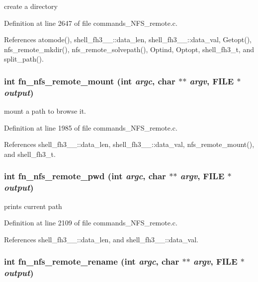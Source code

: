 create a directory 

Definition at line 2647 of file commands\_\-NFS\_\-remote.c.

References atomode(), shell\_\-fh3\_\-\_\-::data\_\-len, shell\_\-fh3\_\-\_\-::data\_\-val, Getopt(), nfs\_\-remote\_\-mkdir(), nfs\_\-remote\_\-solvepath(), Optind, Optopt, shell\_\-fh3\_\-t, and split\_\-path().
\subsubsection{\setlength{\rightskip}{0pt plus 5cm}int fn\_\-nfs\_\-remote\_\-mount (int {\em argc}, char $\ast$$\ast$ {\em argv}, FILE $\ast$ {\em output})}\label{commands__NFS__remote_8c_a57}


mount a path to browse it. 

Definition at line 1985 of file commands\_\-NFS\_\-remote.c.

References shell\_\-fh3\_\-\_\-::data\_\-len, shell\_\-fh3\_\-\_\-::data\_\-val, nfs\_\-remote\_\-mount(), and shell\_\-fh3\_\-t.
\subsubsection{\setlength{\rightskip}{0pt plus 5cm}int fn\_\-nfs\_\-remote\_\-pwd (int {\em argc}, char $\ast$$\ast$ {\em argv}, FILE $\ast$ {\em output})}\label{commands__NFS__remote_8c_a59}


prints current path 

Definition at line 2109 of file commands\_\-NFS\_\-remote.c.

References shell\_\-fh3\_\-\_\-::data\_\-len, and shell\_\-fh3\_\-\_\-::data\_\-val.
\subsubsection{\setlength{\rightskip}{0pt plus 5cm}int fn\_\-nfs\_\-remote\_\-rename (int {\em argc}, char $\ast$$\ast$ {\em argv}, FILE $\ast$ {\em output})}\label{commands__NFS__remote_8c_a66}


